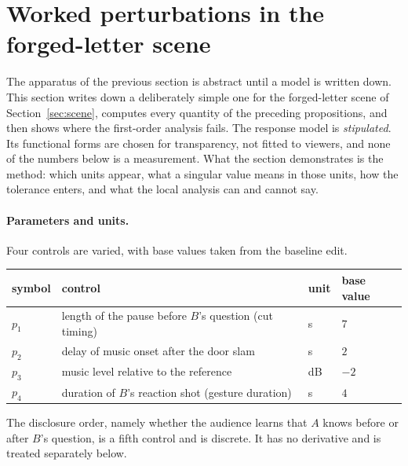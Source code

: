 \section{Worked perturbations in the forged-letter scene}\label{sec:perturb}

The apparatus of the previous section is abstract until a model is written down. This section writes down a deliberately simple one for the forged-letter scene of Section~\ref{sec:scene}, computes every quantity of the preceding propositions, and then shows where the first-order analysis fails. The response model is \emph{stipulated}. Its functional forms are chosen for transparency, not fitted to viewers, and none of the numbers below is a measurement. What the section demonstrates is the method: which units appear, what a singular value means in those units, how the tolerance enters, and what the local analysis can and cannot say.

\paragraph{Parameters and units.} Four controls are varied, with base values taken from the baseline edit.
\begin{center}
\begin{tabular}{llll}
\toprule
symbol & control & unit & base value\\
\midrule
$p_1$ & length of the pause before $B$'s question (cut timing) & s & $7$\\
$p_2$ & delay of music onset after the door slam & s & $2$\\
$p_3$ & music level relative to the reference & dB & $-2$\\
$p_4$ & duration of $B$'s reaction shot (gesture duration) & s & $4$\\
\bottomrule
\end{tabular}
\end{center}
The disclosure order, namely whether the audience learns that $A$ knows before or after $B$'s question, is a fifth control and is discrete. It has no derivative and is treated separately below.

